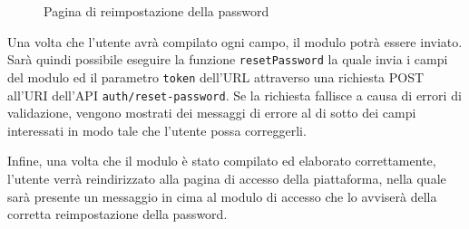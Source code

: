 \begin{figure}[htbp]
	\centering
	\fboxsep=0.5pt
	\fboxrule=0.5pt
	\caption{Pagina di reimpostazione della password}
	\label{fig:modulo_reset_password}
\end{figure}

Una volta che l'utente avr\`a compilato ogni campo, il modulo potr\`a essere inviato. Sar\`a quindi possibile eseguire la funzione \verb|resetPassword| la quale invia i campi del modulo ed il parametro \verb|token| dell'URL attraverso una richiesta POST all'URI dell'API \verb|auth/reset-password|. Se la richiesta fallisce a causa di errori di validazione, vengono mostrati dei messaggi di errore al di sotto dei campi interessati in modo tale che l'utente possa correggerli.

Infine, una volta che il modulo \`e stato compilato ed elaborato correttamente, l'utente verr\`a reindirizzato alla pagina di accesso della piattaforma, nella quale sar\`a presente un messaggio in cima al modulo di accesso che lo avviser\`a della corretta reimpostazione della password.


